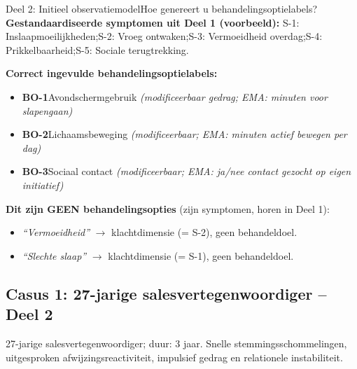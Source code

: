 \documentclass[11pt,a4paper]{article}
\begin{document}
\vspace{0.5em}
\nopagebreak[4]

\begin{voorbeeldbox}{Deel 2: Initieel observatiemodel}{Hoe genereert u behandelingsoptielabels?}
\small
\textbf{Gestandaardiseerde symptomen uit Deel 1 (voorbeeld):}
S-1: Inslaapmoeilijkheden;\enspace S-2: Vroeg ontwaken;\enspace S-3: Vermoeidheid overdag;\enspace S-4: Prikkelbaarheid;\enspace S-5: Sociale terugtrekking.

\medskip
\textbf{Correct ingevulde behandelingsoptielabels:}
\begin{itemize}[topsep=2pt,itemsep=1pt]
\item \textbf{BO-1}\enspace Avondschermgebruik
  \hfill\textit{(modificeerbaar gedrag; EMA: minuten voor slapengaan)}
\item \textbf{BO-2}\enspace Lichaamsbeweging
  \hfill\textit{(modificeerbaar; EMA: minuten actief bewegen per dag)}
\item \textbf{BO-3}\enspace Sociaal contact
  \hfill\textit{(modificeerbaar; EMA: ja/nee contact gezocht op eigen initiatief)}
\end{itemize}

\medskip
\textbf{\color{StrongRed}Dit zijn GEEN behandelingsopties} (zijn symptomen, horen in Deel 1):
\begin{itemize}[topsep=1pt,itemsep=0pt]
\item \textit{``Vermoeidheid''} $\rightarrow$ klachtdimensie (= S-2), geen behandeldoel.
\item \textit{``Slechte slaap''} $\rightarrow$ klachtdimensie (= S-1), geen behandeldoel.
\end{itemize}
\end{voorbeeldbox}

\vspace{0.5em}

\newpage
\subsection*{Casus 1: 27-jarige salesvertegenwoordiger -- Deel 2}

\begin{complaintbox}[title={Casus 1: verkorte klachtomschrijving}]
\small 27-jarige salesvertegenwoordiger; duur: 3 jaar. Snelle stemmingsschommelingen, uitgesproken afwijzingsreactiviteit, impulsief gedrag en relationele instabiliteit.
\end{complaintbox}
\end{document}
